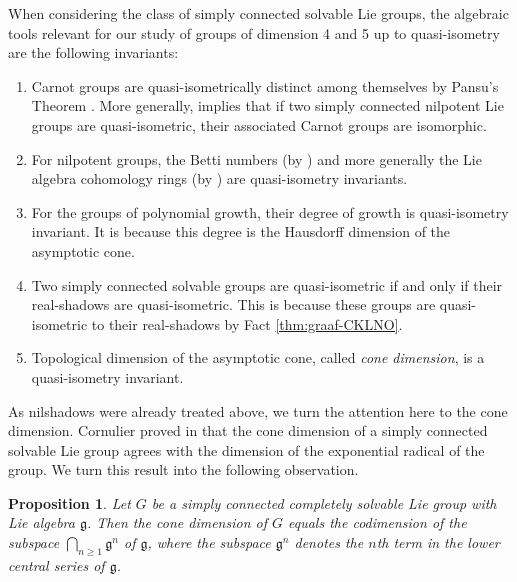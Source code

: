 \documentclass[a4paper,12pt]{amsart}
\theoremstyle{plain}
\theoremstyle{definition}
\theoremstyle{plain}
\newtheorem{prop}[maar]{Proposition}
\theoremstyle{remark}
\begin{document}
When considering the class of simply connected solvable Lie groups, the algebraic tools relevant for our study of groups of dimension 4 and 5 up to quasi-isometry are the following invariants:
\begin{enumerate}[label=(Inv-\arabic*)]
	\item \label{inv:A} Carnot groups are quasi-isometrically distinct among themselves by Pansu's Theorem \cite{pansu}. More generally, \cite{pansu} implies that if two simply connected nilpotent Lie groups are quasi-isometric, their associated Carnot groups are isomorphic.
	\item \label{inv:B} For nilpotent groups, the Betti numbers (by \cite{Shalom}) and more generally the Lie algebra cohomology rings (by \cite{Sauer2006}) are quasi-isometry invariants.
	\item \label{inv:C} For the groups of polynomial growth, their degree of growth is quasi-isometry invariant. It is because this degree is the Hausdorff dimension of the asymptotic cone.
	\item \label{inv:D} Two simply connected solvable groups are quasi-isometric if and only if their real-shadows are quasi-isometric. This is because these groups are quasi-isometric to their real-shadows by Fact \ref{thm:graaf-CKLNO}.
	\item \label{inv:E} Topological dimension of the asymptotic cone, called \emph{cone dimension}, is a quasi-isometry invariant.
\end{enumerate}
As nilshadows were already treated above, we turn the attention here to the cone dimension. Cornulier proved in \cite{MR2399134} that the cone dimension of a simply connected solvable Lie group agrees with the dimension of the exponential radical of the group. 
We turn this result into the following observation.

\begin{prop} \label{prop:cone-dimensions-algebraically}
	Let \( G \) be a simply connected completely solvable Lie group with Lie algebra \( \mathfrak{g} \). Then the cone dimension of \( G \) equals the codimension of the subspace \( \bigcap_{n \ge 1} \mathfrak{g}^{n} \) of \( \mathfrak{g} \), where the subspace \( \mathfrak{g}^n \) denotes the \(n \)th term in the lower central series of \nolinebreak \( \mathfrak{g} \).
\end{prop}
\end{document}
